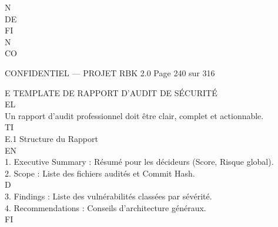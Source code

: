 N\\
DE\\
FI\\
N\\
CO\\
\vspace{0.5em}
\vspace{0.5em}
\vspace{0.5em}
\vspace{0.5em}
\begin{confidential}CONFIDENTIEL — PROJET RBK 2.0                                        Page 240 sur 316\end{confidential}
E \textbar{} TEMPLATE DE RAPPORT D’AUDIT DE SÉCURITÉ\\
\vspace{0.5em}
\vspace{0.5em}
\vspace{0.5em}
\vspace{0.5em}
EL\\
Un rapport d’audit professionnel doit être clair, complet et actionnable.\\
\vspace{0.5em}
\vspace{0.5em}
\vspace{0.5em}
\vspace{0.5em}
TI\\
E.1 Structure du Rapport\\
\vspace{0.5em}
\vspace{0.5em}
\vspace{0.5em}
\vspace{0.5em}
EN\\
1. Executive Summary : Résumé pour les décideurs (Score, Risque global).\\
\vspace{0.5em}
2. Scope : Liste des fichiers audités et Commit Hash.\\
\vspace{0.5em}
\vspace{0.5em}
\vspace{0.5em}
\vspace{0.5em}
D\\
3. Findings : Liste des vulnérabilités classées par sévérité.\\
\vspace{0.5em}
4. Recommendations : Conseils d’architecture généraux.\\
\vspace{0.5em}
FI\\
